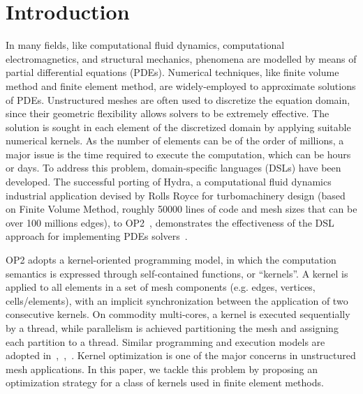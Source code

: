 \documentclass[conference]{IEEEtran}
\begin{document}
\section{Introduction}
In many fields, like computational fluid dynamics, computational electromagnetics, and structural mechanics, phenomena are modelled by means of partial differential equations (PDEs). Numerical techniques, like finite volume method and finite element method, are widely-employed to approximate solutions of PDEs. Unstructured meshes are often used to discretize the equation domain, since their geometric flexibility allows solvers to be extremely effective. The solution is sought in each element of the discretized domain by applying suitable numerical kernels. As the number of elements can be of the order of millions, a major issue is the time required to execute the computation, which can be hours or days. To address this problem, domain-specific languages (DSLs) have been developed. The successful porting of Hydra, a computational fluid dynamics industrial application devised by Rolls Royce for turbomachinery design (based on Finite Volume Method, roughly 50000 lines of code and mesh sizes that can be over 100 millions edges), to OP2~\cite{pyop2isc}, demonstrates the effectiveness of the DSL approach for implementing PDEs solvers~\cite{IstvanHydra}.

OP2 adopts a kernel-oriented programming model, in which the computation semantics is expressed through self-contained functions, or ``kernels''. A kernel is applied to all elements in a set of mesh components (e.g. edges, vertices, cells/elements), with an implicit synchronization between the application of two consecutive kernels. On commodity multi-cores, a kernel is executed sequentially by a thread, while parallelism is achieved partitioning the mesh and assigning each partition to a thread. Similar programming and execution models are adopted in~\cite{Fenics},~\cite{fluidity_manual_v4},~\cite{lizst}. Kernel optimization is one of the major concerns in unstructured mesh applications. In this paper, we tackle this problem by proposing an optimization strategy for a class of kernels used in finite element methods.
\end{document}
